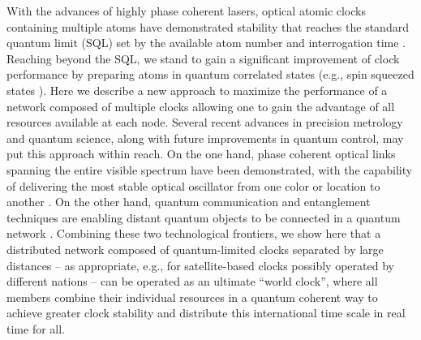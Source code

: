  
With the advances of highly phase coherent lasers, optical atomic clocks
containing multiple atoms have demonstrated stability that reaches the standard
quantum limit (SQL) set by the available atom number 
and interrogation time
\cite{Bloom2013, Hinkley2013, Nicholson2012}.
Reaching beyond the SQL, we stand to gain a significant improvement of clock
performance by preparing atoms in quantum correlated states (e.g., spin squeezed
states \cite{Leroux2010, Buzek1999}). Here we describe a new
approach to maximize the performance of a network composed of multiple clocks allowing one to gain the
advantage of all resources available at each node.
Several recent advances in precision metrology and quantum science,
along with future improvements in quantum control,  
may put this
approach within reach.  On the
 one hand, 
 phase coherent
optical links spanning the entire visible spectrum 
have been demonstrated, with the capability of delivering the most
stable optical oscillator from one color or location to another \cite{Ye2003,
Droste2013}.
On the other hand, quantum communication and entanglement techniques are
enabling distant quantum objects to be connected in a quantum network
\cite{cirac, kimble, acin}.
Combining these two technological frontiers, we show here that  a distributed
network composed of quantum-limited clocks separated by large distances -- as
appropriate, e.g., for satellite-based clocks possibly operated by different
nations -- can be operated  as an ultimate ``world clock'', where all members
combine their individual resources in a quantum coherent way  to achieve greater
clock stability and distribute this international time scale in real time for
all. 

